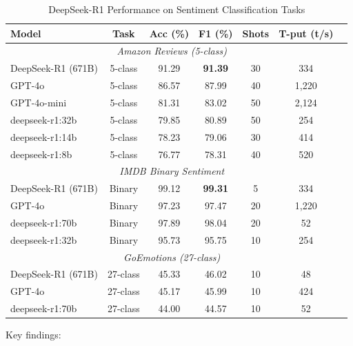 \begin{table}[htbp]
\centering
\caption{DeepSeek-R1 Performance on Sentiment Classification Tasks}
\label{tab:deepseek_sentiment}
\begin{tabular}{@{}lcccccc@{}}
\toprule
\textbf{Model} & \textbf{Task} & \textbf{Acc (\%)} & \textbf{F1 (\%)} & \textbf{Shots} & \textbf{T-put (t/s)} \\
\midrule
\multicolumn{6}{c}{\textit{Amazon Reviews (5-class)}} \\
\midrule
DeepSeek-R1 (671B) & 5-class & 91.29 & \textbf{91.39} & 30 & 334 \\
GPT-4o & 5-class & 86.57 & 87.99 & 40 & 1,220 \\
GPT-4o-mini & 5-class & 81.31 & 83.02 & 50 & 2,124 \\
deepseek-r1:32b & 5-class & 79.85 & 80.89 & 50 & 254 \\
deepseek-r1:14b & 5-class & 78.23 & 79.06 & 30 & 414 \\
deepseek-r1:8b & 5-class & 76.77 & 78.31 & 40 & 520 \\
\midrule
\multicolumn{6}{c}{\textit{IMDB Binary Sentiment}} \\
\midrule
DeepSeek-R1 (671B) & Binary & 99.12 & \textbf{99.31} & 5 & 334 \\
GPT-4o & Binary & 97.23 & 97.47 & 20 & 1,220 \\
deepseek-r1:70b & Binary & 97.89 & 98.04 & 20 & 52 \\
deepseek-r1:32b & Binary & 95.73 & 95.75 & 10 & 254 \\
\midrule
\multicolumn{6}{c}{\textit{GoEmotions (27-class)}} \\
\midrule
DeepSeek-R1 (671B) & 27-class & 45.33 & 46.02 & 10 & 48 \\
GPT-4o & 27-class & 45.17 & 45.99 & 10 & 424 \\
deepseek-r1:70b & 27-class & 44.00 & 44.57 & 10 & 52 \\
\bottomrule
\end{tabular}
\end{table}

Key findings:

